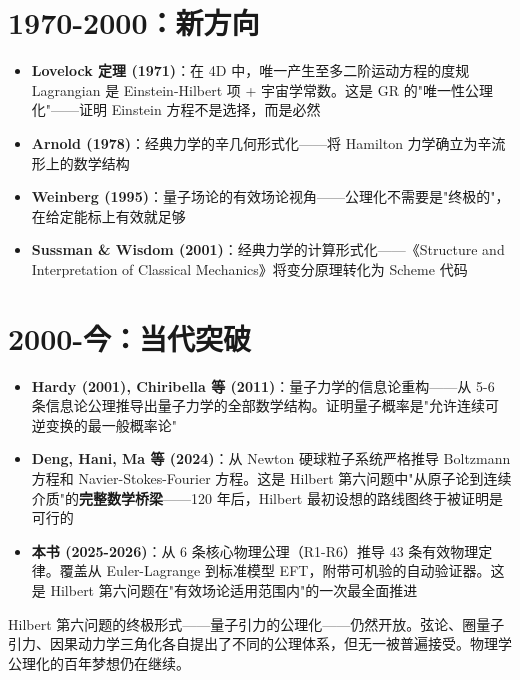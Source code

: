 \documentclass[11pt,a4paper,openany]{book}
\begin{document}
\section*{1970-2000：新方向}

\begin{itemize}
  \item \textbf{Lovelock 定理 (1971)}：在 4D 中，唯一产生至多二阶运动方程的度规 Lagrangian 是 Einstein-Hilbert 项 + 宇宙学常数。这是 GR 的"唯一性公理化"——证明 Einstein 方程不是选择，而是必然
  \item \textbf{Arnold (1978)}：经典力学的辛几何形式化——将 Hamilton 力学确立为辛流形上的数学结构
  \item \textbf{Weinberg (1995)}：量子场论的有效场论视角——公理化不需要是"终极的"，在给定能标上有效就足够
  \item \textbf{Sussman \& Wisdom (2001)}：经典力学的计算形式化——《Structure and Interpretation of Classical Mechanics》将变分原理转化为 Scheme 代码
\end{itemize}

\section*{2000-今：当代突破}

\begin{itemize}
  \item \textbf{Hardy (2001), Chiribella 等 (2011)}：量子力学的信息论重构——从 5-6 条信息论公理推导出量子力学的全部数学结构。证明量子概率是"允许连续可逆变换的最一般概率论"
  \item \textbf{Deng, Hani, Ma 等 (2024)}：从 Newton 硬球粒子系统严格推导 Boltzmann 方程和 Navier-Stokes-Fourier 方程。这是 Hilbert 第六问题中"从原子论到连续介质"的\textbf{完整数学桥梁}——120 年后，Hilbert 最初设想的路线图终于被证明是可行的
  \item \textbf{本书 (2025-2026)}：从 6 条核心物理公理（R1-R6）推导 43 条有效物理定律。覆盖从 Euler-Lagrange 到标准模型 EFT，附带可机验的自动验证器。这是 Hilbert 第六问题在"有效场论适用范围内"的一次最全面推进
\end{itemize}

\begin{insightbox}[未竟的事业]
  Hilbert 第六问题的终极形式——量子引力的公理化——仍然开放。弦论、圈量子引力、因果动力学三角化各自提出了不同的公理体系，但无一被普遍接受。物理学公理化的百年梦想仍在继续。
\end{insightbox}
\end{document}
